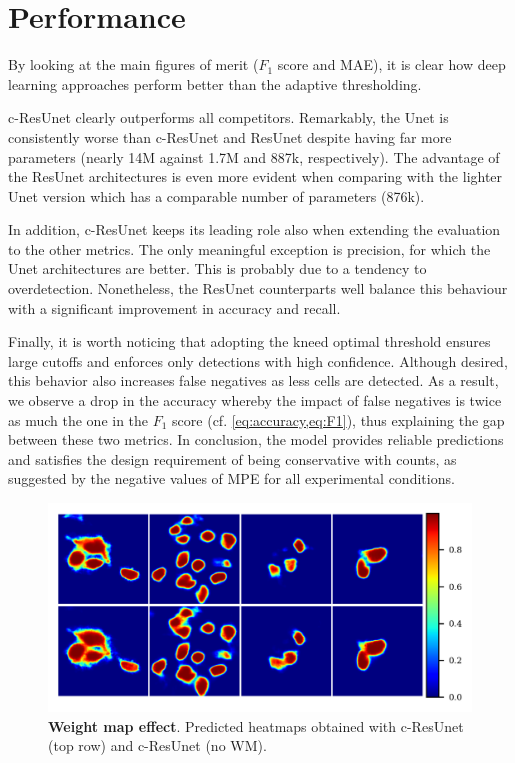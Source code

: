 \section{Performance}

By looking at the main figures of merit ($F_1$ score and MAE), it is clear how deep learning approaches perform better than the adaptive thresholding.

c-ResUnet clearly outperforms all competitors.
Remarkably, the Unet is consistently worse than c-ResUnet and ResUnet despite having far more parameters (nearly 14M against 1.7M and 887k, respectively).
The advantage of the ResUnet architectures is even more evident when comparing with the lighter Unet version which has a comparable number of parameters (876k).

In addition, c-ResUnet keeps its leading role also when extending the evaluation to the other metrics.
The only meaningful exception is precision, for which the Unet architectures are better. This is probably due to a tendency to overdetection. 
Nonetheless, the ResUnet counterparts well balance this behaviour with a significant improvement in accuracy and recall.

Finally, it is worth noticing that adopting the kneed optimal threshold ensures large cutoffs and enforces only detections with high confidence.
Although desired, this behavior also increases false negatives as less cells are detected. 
As a result, we observe a drop in the accuracy whereby the impact of false negatives is twice as much the one in the $F_1$ score (cf. \cref{eq:accuracy,eq:F1}), thus explaining the gap between these two metrics.
In conclusion, the model provides reliable predictions and satisfies the design requirement of being conservative with counts, as suggested by the negative values of MPE for all experimental conditions.

\begin{figure}[!b]
\centering
\includegraphics[width=\textwidth]{figures/130_methods/weigths_effect.png}
\caption{\textbf{Weight map effect}. 
Predicted heatmaps obtained with c-ResUnet (top row) and c-ResUnet (no WM).} 
\label{fig:weigths_effect}
\end{figure}
